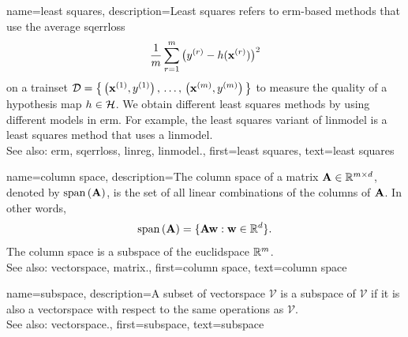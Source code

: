 {name={least squares},
 description={Least squares refers to \gls{erm}-based 
               methods that use the average \gls{sqerrloss} 
			   $$ \frac{1}{m} \sum_{r=1}^{m} \big( y^{(r)} 
			   - h({\bf x}^{(r)}) \big)^{2} $$   
			   on a \gls{trainset} $\mathcal{D} = \big\{ \left( {\bf x}^{(1)},y^{(1)} \right), \,\ldots, \,
			   \left( {\bf x}^{(m)},y^{(m)} \right) \big\}$	
			   to measure the quality of a \gls{hypothesis} \gls{map} $h \in \mathcal{H}$. 
			   We obtain different least squares methods by using different \glspl{model} 
			   in \gls{erm}. For example, the least squares variant of \gls{linmodel} 
			   is a least squares method that uses a \gls{linmodel}.
			   \\
		See also: \gls{erm}, \gls{sqerrloss}, \gls{linreg}, \gls{linmodel}.},
	first={least squares},
	text={least squares}
}

{name={column space},
 description={The column space of a \gls{matrix} 
                 ${\bf A} \in \mathbb{R}^{m \times d}$,
			   denoted by ${\rm span}\left({\bf A} \right)$, is the set of all linear combinations of the 
			   columns of ${\bf A}$. In other words, 
			   $$ {\rm span}\left({\bf A} \right) = \{ {\bf A} {\bf w} : {\bf w} \in \mathbb{R}^{d} \}. $$
			   The column space is a subspace of the \gls{euclidspace} $\mathbb{R}^{m}$.
			   \\
		See also: \gls{vectorspace}, \gls{matrix}.},
	first={column space},
	text={column space}
}

{name={subspace},
 description={A subset of \gls{vectorspace} $\mathcal{V}$ is a subspace of $\mathcal{V}$ if it is also a 
			   \gls{vectorspace} with respect to the same operations as $\mathcal{V}$.
			   \\
		See also: \gls{vectorspace}.},
	first={subspace},
	text={subspace}
}


